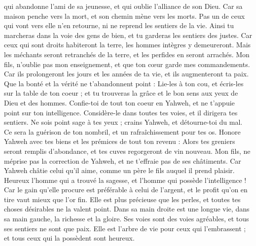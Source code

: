 \begin{multicols}{2}
qui abandonne l'ami de sa jeunesse, et qui oublie l'alliance de son Dieu.
Car sa maison penche vers la mort, et son chemin mène vers les morts.
Pas un de ceux qui vont vers elle n'en retourne, ni ne reprend les sentiers de la vie.
Ainsi tu marcheras dans la voie des gens de bien, et tu garderas les sentiers des justes.
Car ceux qui sont droits habiteront la terre, les hommes intègres y demeureront.
Mais les méchants seront retranchés de la terre, et les perfides en seront arrachés.
\VerseOne{}Mon fils, n'oublie pas mon enseignement, et que ton cœur garde mes commandements.
Car ils prolongeront les jours et les années de ta vie, et ils augmenteront ta paix.
Que la bonté et la vérité ne t'abandonnent point : Lie-les à ton cou, et écris-les sur la table de ton coeur ;
et tu trouveras la grâce et le bon sens aux yeux de Dieu et des hommes.
Confie-toi de tout ton coeur en Yahweh, et ne t'appuie point sur ton intelligence.
Considère-le dans toutes tes voies, et il dirigera tes sentiers.
Ne sois point sage à tes yeux ; crains Yahweh, et détourne-toi du mal.
Ce sera la guérison de ton nombril, et un rafraîchissement pour tes os.
Honore Yahweh avec tes biens et les prémices de tout ton revenu :
Alors tes greniers seront remplis d'abondance, et tes cuves regorgeront de vin nouveau.
Mon fils, ne méprise pas la correction de Yahweh, et ne t'effraie pas de ses châtiments.
Car Yahweh châtie celui qu'il aime, comme un père le fils auquel il prend plaisir.
Heureux l'homme qui a trouvé la sagesse, et l'homme qui possède l'intelligence !
Car le gain qu'elle procure est préférable à celui de l'argent, et le profit qu'on en tire vaut mieux que l'or fin.
Elle est plus précieuse que les perles, et toutes tes choses désirables ne la valent point.
Dans sa main droite est une longue vie, dans sa main gauche, la richesse et la gloire.
Ses voies sont des voies agréables, et tous ses sentiers ne sont que paix.
Elle est l'arbre de vie pour ceux qui l'embrassent ; et tous ceux qui la possèdent sont heureux.

\end{multicols}
